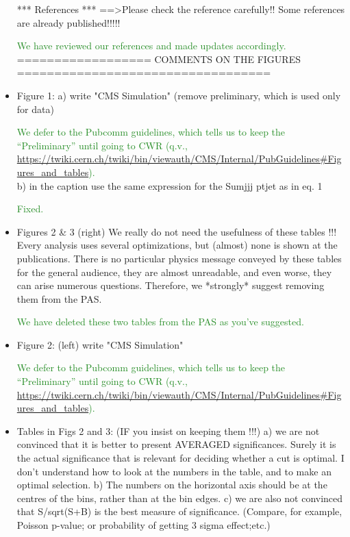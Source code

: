 \documentclass[paper=a4, fontsize=11pt]{scrartcl}
\begin{document}
\begin{itemize}
*** References *** 
==\textgreater Please check the reference carefully!! Some references are already 
published!!!!! 

\textcolor{ForestGreen}{We have reviewed our references and made updates accordingly.}\\


================== COMMENTS ON THE FIGURES ================================== 


\item Figure 1: 
a) write "CMS Simulation" (remove preliminary, which is used only for data) 

\textcolor{ForestGreen}{We defer to the Pubcomm guidelines, which tells us to keep the
``Preliminary'' until going to CWR (q.v.,
	\url{https://twiki.cern.ch/twiki/bin/viewauth/CMS/Internal/PubGuidelines\#Figures_and_tables}).}\\

b) in the caption use the same expression for the Sumjjj ptjet as in eq. 1 

\textcolor{ForestGreen}{Fixed.}\\

\item Figures 2 \& 3 (right) 
We really do not need the usefulness of these tables !!! Every analysis uses 
several optimizations, but (almost) none is shown at the publications. There 
is no particular physics message conveyed by these tables for the general 
audience, they are almost unreadable, and even worse, they can arise numerous 
questions. Therefore, we *strongly* suggest removing them from the PAS. 

\textcolor{ForestGreen}{We have deleted these two tables from the PAS as you've suggested.}\\


\item Figure 2: 
(left) write "CMS Simulation" 

\textcolor{ForestGreen}{We defer to the Pubcomm guidelines, which tells us to keep the
``Preliminary'' until going to CWR (q.v.,
	\url{https://twiki.cern.ch/twiki/bin/viewauth/CMS/Internal/PubGuidelines\#Figures_and_tables}).}\\


\item Tables in Figs 2 and 3: (IF you insist on keeping them !!!) 
a) we are not convinced that it is better to present AVERAGED significances. 
Surely it is the actual significance that is relevant for deciding whether 
a cut is optimal. I don't understand how to look at the numbers in the table, 
and to make an optimal selection. 
b) The numbers on the horizontal axis should be at the centres of the bins, 
rather than at the bin edges. 
c) we are also not convinced that S/sqrt(S+B) is the best measure of 
significance. (Compare, for example, Poisson p-value; or probability of 
getting 3 sigma effect;etc.) 


\end{itemize}
\end{document}
